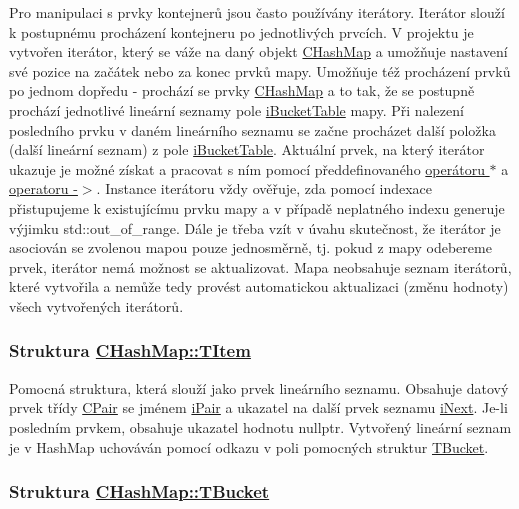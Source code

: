 Pro manipulaci s prvky kontejnerů jsou často používány iterátory. Iterátor slouží k postupnému procházení kontejneru po jednotlivých prvcích. V projektu je vytvořen iterátor, který se váže na daný objekt \hyperlink{class_c_hash_map}{C\+Hash\+Map} a umožňuje nastavení své pozice na začátek nebo za konec prvků mapy. Umožňuje též procházení prvků po jednom dopředu -\/ prochází se prvky \hyperlink{class_c_hash_map}{C\+Hash\+Map} a to tak, že se postupně prochází jednotlivé lineární seznamy pole \hyperlink{class_c_hash_map_a1018fdaad71e8207e747db26e88025d6}{i\+Bucket\+Table} mapy. Při nalezení posledního prvku v daném lineárního seznamu se začne procházet další položka (další lineární seznam) z pole \hyperlink{class_c_hash_map_a1018fdaad71e8207e747db26e88025d6}{i\+Bucket\+Table}. Aktuální prvek, na který iterátor ukazuje je možné získat a pracovat s ním pomocí předdefinovaného \hyperlink{class_c_hash_map_1_1_c_forward_iterator_a7f44403bd74fc55f0263b56cf15fc64b}{operátoru $\ast$} a \hyperlink{class_c_hash_map_1_1_c_forward_iterator_a65fde4bd503e69c29b15688cd8c21eaf}{operatoru -\/$>$}. Instance iterátoru vždy ověřuje, zda pomocí indexace přistupujeme k existujícímu prvku mapy a v případě neplatného indexu generuje výjimku {\ttfamily std\+::out\+\_\+of\+\_\+range}. Dále je třeba vzít v úvahu skutečnost, že iterátor je asociován se zvolenou mapou pouze jednosměrně, tj. pokud z mapy odebereme prvek, iterátor nemá možnost se aktualizovat. Mapa neobsahuje seznam iterátorů, které vytvořila a nemůže tedy provést automatickou aktualizaci (změnu hodnoty) všech vytvořených iterátorů.

\subsubsection*{Struktura \hyperlink{struct_c_hash_map_1_1_t_item}{C\+Hash\+Map\+::\+T\+Item}}

Pomocná struktura, která slouží jako prvek lineárního seznamu. Obsahuje datový prvek třídy \hyperlink{class_c_pair}{C\+Pair} se jménem \hyperlink{struct_c_hash_map_1_1_t_item_a9b832f579f07c1011ef58d89a589470a}{i\+Pair} a ukazatel na další prvek seznamu \hyperlink{struct_c_hash_map_1_1_t_item_a7d4fed6cab5e5e567fddc934a8ace1f7}{i\+Next}. Je-\/li posledním prvkem, obsahuje ukazatel hodnotu {\ttfamily nullptr}. Vytvořený lineární seznam je v Hash\+Map uchováván pomocí odkazu v poli pomocných struktur \hyperlink{struct_c_hash_map_1_1_t_bucket}{T\+Bucket}.

\subsubsection*{Struktura \hyperlink{struct_c_hash_map_1_1_t_bucket}{C\+Hash\+Map\+::\+T\+Bucket}}

